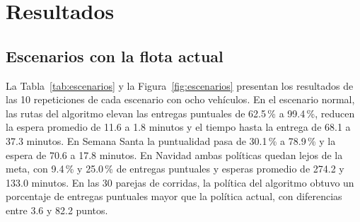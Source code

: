 \documentclass[11pt,letterpaper]{article}
\begin{document}
\section{Resultados}

\subsection{Escenarios con la flota actual}

La Tabla~\ref{tab:escenarios} y la Figura~\ref{fig:escenarios} presentan los resultados de las 10 repeticiones de cada escenario con ocho vehículos. En el escenario normal, las rutas del algoritmo elevan las entregas puntuales de 62.5\,\% a 99.4\,\%, reducen la espera promedio de 11.6 a 1.8 minutos y el tiempo hasta la entrega de 68.1 a 37.3 minutos. En Semana Santa la puntualidad pasa de 30.1\,\% a 78.9\,\% y la espera de 70.6 a 17.8 minutos. En Navidad ambas políticas quedan lejos de la meta, con 9.4\,\% y 25.0\,\% de entregas puntuales y esperas promedio de 274.2 y 133.0 minutos. En las 30 parejas de corridas, la política del algoritmo obtuvo un porcentaje de entregas puntuales mayor que la política actual, con diferencias entre 3.6 y 82.2 puntos.
\end{document}
